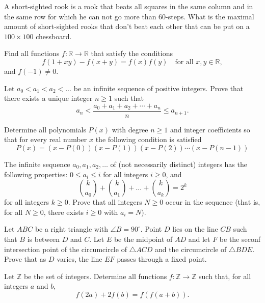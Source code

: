\documentclass[11pt]{scrartcl}
\begin{document}
\begin{problem}[105422576188851]
A short-sighted rook is a rook that beats all squares in the same column and in the same row for which he can not go more than $60$-steps.
What is the maximal amount of short-sighted rooks that don't beat each other that can be put on a $100\times 100$ chessboard.
\end{problem}
\begin{problem}[5129113369150286745]
Find all functions $f:\mathbb{R} \rightarrow \mathbb{R}$ that satisfy the conditions
\[f(1+xy)-f(x+y)=f(x)f(y) \quad \text{for all } x,y \in \mathbb{R},\]
and $f(-1) \neq 0$.
\end{problem}
\begin{problem}[890162155331408920]
Let $a_0 < a_1 < a_2 < \dots$ be an infinite sequence of positive integers. Prove that there exists a unique integer $n\geq 1$ such that
\[a_n < \frac{a_0+a_1+a_2+\cdots+a_n}{n} \leq a_{n+1}.\]
\end{problem}
\begin{problem}[5871948911817167044]
Determine all polynomials $P(x)$ with degree $n\geq 1$ and integer coefficients so that for every real number $x$ the following condition is satisfied
$$P(x)=(x-P(0))(x-P(1))(x-P(2))\cdots (x-P(n-1))$$
\end{problem}
\begin{problem}[2134021625648303394]
The infinite sequence $a_0,a _1, a_2, \dots$ of (not necessarily distinct) integers has the following properties: $0\le a_i \le i$ for all integers $i\ge 0$, and\[\binom{k}{a_0} + \binom{k}{a_1} + \dots + \binom{k}{a_k} = 2^k\]for all integers $k\ge 0$. Prove that all integers $N\ge 0$ occur in the sequence (that is, for all $N\ge 0$, there exists $i\ge 0$ with $a_i=N$).
\end{problem}
\begin{problem}[7335226310540156292]
	Let $ABC$ be a right triangle with $\angle B=90^{\circ}$. Point $D$ lies on the line $CB$ such that $B$ is between $D$ and $C$. Let $E$ be the midpoint of $AD$ and let $F$ be the seconf intersection point of the circumcircle of $\triangle ACD$ and the circumcircle of $\triangle BDE$. Prove that as $D$ varies, the line $EF$ passes through a fixed point.
\end{problem}
\begin{problem}[684265043263216]
Let $\mathbb{Z}$ be the set of integers. Determine all functions $f: \mathbb{Z} \rightarrow \mathbb{Z}$ such that, for all integers $a$ and $b$,$$f(2a)+2f(b)=f(f(a+b)).$$
\end{problem}
\end{document}
